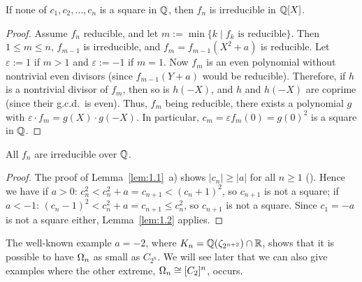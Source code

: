 \begin{sharedlemma}
  \label{lem:1.2}
  If none of $c_1, c_2, \dots, c_n$ is a square in $\mathbb{Q}$, then $f_n$ is irreducible in $\mathbb{Q}[X]$.
\end{sharedlemma}
\begin{proof}
  Assume $f_n$ reducible, and let $m := \min\{k \mid f_k \text{ is reducible}\}$. Then
  $1 \le m \le n$, $f_{m-1}$ is irreducible, and $f_m = f_{m-1}(X^2 + a)$ is reducible. Let
  $\varepsilon := 1$ if $m > 1$ and $\varepsilon := -1$ if $m = 1$. Now $f_m$ is an even
  polynomial without nontrivial even divisors (since $f_{m-1}(Y + a)$ would be reducible).
  Therefore, if $h$ is a nontrivial divisor of $f_m$, then so is $h(-X)$, and $h$ and $h(-X)$ are
  coprime (since their g.c.d.\ is even). Thus, $f_m$ being reducible, there exists a polynomial
  $g$ with $\varepsilon \cdot f_m = g(X) \cdot g(-X)$. In particular,
  $c_m = \varepsilon f_m(0) = g(0)^2$ is a square in $\mathbb{Q}$.
\end{proof}

\begin{corollary}
  \label{cor:1.3}
  \leanok
  All $f_n$ are irreducible over $\mathbb{Q}$.
\end{corollary}
\begin{proof}
  \leanok
  The proof of Lemma~\ref{lem:1.1}~a) shows $|c_n| \ge |a|$ for all $n \ge 1$
  (). Hence we have if
  $a > 0$: $c_n^2 < c_n^2 + a = c_{n+1} < (c_n + 1)^2$, so $c_{n+1}$ is not a square; if
  $a < -1$: $(c_n - 1)^2 < c_n^2 + a = c_{n+1} \le c_n^2$, so $c_{n+1}$ is not a square. Since
  $c_1 = -a$ is not a square either, Lemma~\ref{lem:1.2} applies.
\end{proof}

The well-known example $a = -2$, where $K_n = \mathbb{Q}(\zeta_{2^{n+2}}) \cap \mathbb{R}$, shows that
it is possible to have $\Omega_n$ as small as $C_{2^n}$. We will see later that we can also give
examples where the other extreme, $\Omega_n \cong [C_2]^{n}$, occurs.


